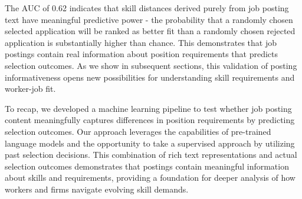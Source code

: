 The AUC of 0.62 indicates that skill distances derived purely from job posting text have meaningful predictive power - 
the probability that a randomly chosen selected application will be ranked as better fit than a randomly chosen rejected 
application is substantially higher than chance. This demonstrates that job postings contain real information about position 
requirements that predicts selection outcomes. As we show in subsequent sections, this validation of posting informativeness 
opens new possibilities for understanding skill requirements and worker-job fit.

To recap, we developed a machine learning pipeline to test whether job posting content meaningfully captures differences in 
position requirements by predicting selection outcomes. Our approach leverages the capabilities of pre-trained language models
and the opportunity to take a supervised approach by utilizing past selection decisions. This combination of rich text 
representations and actual selection outcomes demonstrates that postings contain meaningful information about skills and 
requirements, providing a foundation for deeper analysis of how workers and firms navigate evolving skill demands.

